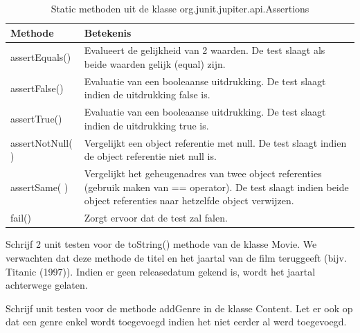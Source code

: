 \begin{table}[h!]
\centering
\begin{tabularx}{\textwidth}{| l | X |}
 \hline
 Methode & Betekenis\\ 
 \hline\hline
assertEquals() & Evalueert de gelijkheid van 2 waarden. De test slaagt als beide
waarden gelijk (equal) zijn.\\
\hline
assertFalse() & Evaluatie van een booleaanse uitdrukking. De test slaagt indien
de uitdrukking false is.\\
\hline
assertTrue() & Evaluatie van een booleaanse uitdrukking. De test slaagt indien
de uitdrukking true is.\\
\hline
assertNotNull( ) & Vergelijkt een object referentie met null. De test slaagt indien de
object referentie niet null is.\\
\hline
assertSame( ) & Vergelijkt het geheugenadres van twee object referenties
(gebruik maken van == operator). De test slaagt indien beide
object referenties naar hetzelfde object verwijzen.\\
\hline
fail() & Zorgt ervoor dat de test zal falen.\\
 \hline
\end{tabularx}
\caption{Static methoden uit de klasse org.junit.jupiter.api.Assertions}
\label{table:assertions}
\end{table}

\begin{oefening}
Schrijf 2 unit testen voor de toString() methode van de klasse Movie. We verwachten dat deze methode de titel en het jaartal van de film teruggeeft (bijv. Titanic (1997)). Indien er geen releasedatum gekend is, wordt het jaartal achterwege gelaten.
\end{oefening}

\begin{oefening}
Schrijf unit testen voor de methode addGenre in de klasse Content. Let er ook op dat een  genre enkel wordt toegevoegd indien het niet eerder al werd toegevoegd. 
\end{oefening}

